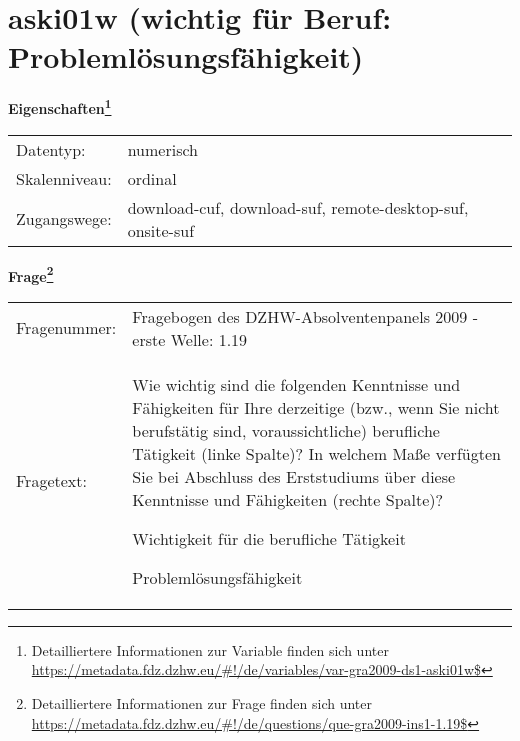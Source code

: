 
    \setcounter{footnote}{0}

    \vspace*{-1.8cm}
	\section{aski01w (wichtig für Beruf: Problemlösungsfähigkeit)}
	\label{section:aski01w}



    \vspace*{0.5cm}
    \noindent\textbf{Eigenschaften\footnote{Detailliertere Informationen zur Variable finden sich unter
		\url{https://metadata.fdz.dzhw.eu/\#!/de/variables/var-gra2009-ds1-aski01w$}}}\\
	\begin{tabularx}{\hsize}{@{}lX}
	Datentyp: & numerisch \\
	Skalenniveau: & ordinal \\
	Zugangswege: &
	  download-cuf, 
	  download-suf, 
	  remote-desktop-suf, 
	  onsite-suf
 \\
    \end{tabularx}



				\vspace*{0.5cm}
                \noindent\textbf{Frage\footnote{Detailliertere Informationen zur Frage finden sich unter
		              \url{https://metadata.fdz.dzhw.eu/\#!/de/questions/que-gra2009-ins1-1.19$}}}\\
				\begin{tabularx}{\hsize}{@{}lX}
					Fragenummer: &
					  Fragebogen des DZHW-Absolventenpanels 2009 - erste Welle:
					  1.19
 \\
					Fragetext: & Wie wichtig sind die folgenden Kenntnisse und Fähigkeiten für Ihre derzeitige (bzw., wenn Sie nicht berufstätig sind, voraussichtliche) berufliche Tätigkeit (linke Spalte)? In welchem Maße verfügten Sie bei Abschluss des Erststudiums über diese Kenntnisse und Fähigkeiten (rechte Spalte)?\par  Wichtigkeit für die berufliche Tätigkeit\par  Problemlösungsfähigkeit \\
				\end{tabularx}





